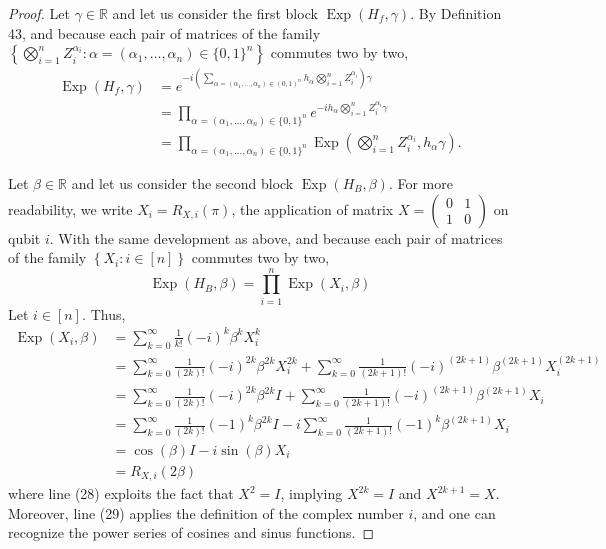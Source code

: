 \begin{proof}
Let $\gamma \in \mathbb{R}$ and let us consider the first block $\operatorname{Exp}\left(H_{f}, \gamma\right)$. By Definition 43, and because each pair of matrices of the family $\left\{\bigotimes_{i=1}^{n} Z_{i}^{\alpha_{i}}: \alpha=\left(\alpha_{1}, \ldots, \alpha_{n}\right) \in\{0,1\}^{n}\right\}$ commutes two by two, %
\begin{align*}
\operatorname{Exp}\left(H_{f}, \gamma\right) & =e^{-i\left(\sum_{\alpha=\left(\alpha_{1}, \ldots, \alpha_{n}\right) \in(0,1)^{n}} h_{\alpha} \bigotimes_{i=1}^{n} Z_{i}^{\alpha_{i}}\right) \gamma}  \tag{23}\\
& =\prod_{\alpha=\left(\alpha_{1}, \ldots, \alpha_{n}\right) \in\{0,1\}^{n}} e^{-i h_{\alpha} \bigotimes_{i=1}^{n} Z_{i}^{\alpha_{i}} \gamma}  \tag{24}\\
& =\prod_{\alpha=\left(\alpha_{1}, \ldots, \alpha_{n}\right) \in\{0,1\}^{n}} \operatorname{Exp}\left(\bigotimes_{i=1}^{n} Z_{i}^{\alpha_{i}}, h_{\alpha} \gamma\right). \tag{25}
\end{align*}

Let $\beta \in \mathbb{R}$ and let us consider the second block $\operatorname{Exp}\left(H_{B}, \beta\right)$. For more readability, we write $X_{i}=R_{X, i}(\pi)$, the application of matrix $X=\left(\begin{array}{ll}0 & 1 \\ 1 & 0\end{array}\right)$ on qubit $i$. With the same development as above, and because each pair of matrices of the family $\left\{X_{i}: i \in[n]\right\}$ commutes two by two,
$$
\operatorname{Exp}\left(H_{B}, \beta\right)=\prod_{i=1}^{n} \operatorname{Exp}\left(X_{i}, \beta\right)
$$
Let $i \in[n]$. Thus,
\begin{align*}
\operatorname{Exp}\left(X_{i}, \beta\right) & =\sum_{k=0}^{\infty} \frac{1}{k!}(-i)^{k} \beta^{k} X_{i}^{k}  \tag{26}\\
& =\sum_{k=0}^{\infty} \frac{1}{(2 k)!}(-i)^{2 k} \beta^{2 k} X_{i}^{2 k}+\sum_{k=0}^{\infty} \frac{1}{(2 k+1)!}(-i)^{(2 k+1)} \beta^{(2 k+1)} X_{i}^{(2 k+1)} \tag{27} \\
& =\sum_{k=0}^{\infty} \frac{1}{(2 k)!}(-i)^{2 k} \beta^{2 k} I+\sum_{k=0}^{\infty} \frac{1}{(2 k+1)!}(-i)^{(2 k+1)} \beta^{(2 k+1)} X_{i}  \tag{28}\\
& =\sum_{k=0}^{\infty} \frac{1}{(2 k)!}(-1)^{k} \beta^{2 k} I-i \sum_{k=0}^{\infty} \frac{1}{(2 k+1)!}(-1)^{k} \beta^{(2 k+1)} X_{i}  \tag{29}\\
& =\cos (\beta) I-i \sin (\beta) X_{i}  \tag{30}\\
& =R_{X, i}(2 \beta) \tag{31}
\end{align*}
where line (28) exploits the fact that $X^{2}=I$, implying $X^{2 k}=I$ and $X^{2 k+1}=X$. Moreover, line (29) applies the definition of the complex number $i$, and one can recognize the power series of cosines and sinus functions.
\end{proof}

